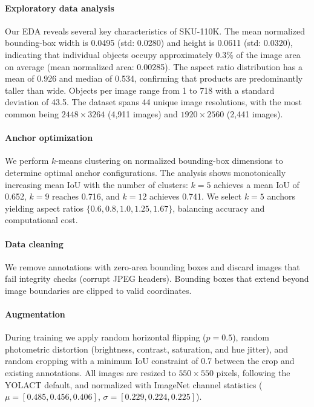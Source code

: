 \documentclass[conference]{IEEEtran}
\begin{document}
\paragraph{Exploratory data analysis}
Our EDA reveals several key characteristics of SKU-110K. The mean
normalized bounding-box width is 0.0495 (std: 0.0280) and height is
0.0611 (std: 0.0320), indicating that individual objects occupy
approximately 0.3\% of the image area on average (mean normalized area:
0.00285). The aspect ratio distribution has a mean of 0.926 and median
of 0.534, confirming that products are predominantly taller than wide.
Objects per image range from 1 to 718 with a standard deviation of 43.5.
The dataset spans 44 unique image resolutions, with the most common being
$2448 \times 3264$ (4,911 images) and $1920 \times 2560$ (2,441 images).

\paragraph{Anchor optimization}
We perform $k$-means clustering on normalized bounding-box dimensions
to determine optimal anchor configurations. The analysis shows
monotonically increasing mean IoU with the number of clusters: $k=5$
achieves a mean IoU of 0.652, $k=9$ reaches 0.716, and $k=12$ achieves
0.741. We select $k=5$ anchors yielding aspect ratios
$\{0.6, 0.8, 1.0, 1.25, 1.67\}$, balancing accuracy and computational
cost.

\paragraph{Data cleaning}
We remove annotations with zero-area bounding boxes and discard images
that fail integrity checks (corrupt JPEG headers). Bounding boxes that
extend beyond image boundaries are clipped to valid coordinates.

\paragraph{Augmentation}
During training we apply random horizontal flipping ($p=0.5$), random
photometric distortion (brightness, contrast, saturation, and hue jitter),
and random cropping with a minimum IoU constraint of 0.7 between the crop
and existing annotations. All images are resized to $550 \times 550$
pixels, following the YOLACT default, and normalized with ImageNet channel
statistics ($\mu = [0.485, 0.456, 0.406]$, $\sigma = [0.229, 0.224,
0.225]$).
\end{document}
